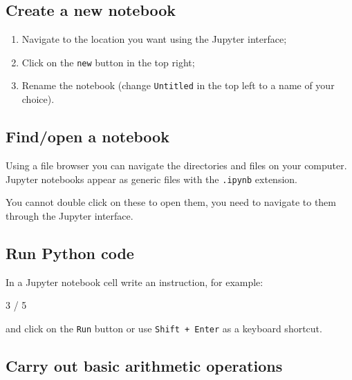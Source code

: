 \subsection{Create a new notebook}
\begin{enumerate}

\item 

Navigate to the location you want using the Jupyter interface;

\item 

Click on the \texttt{new} button in the top right;

\item 

Rename the notebook (change \texttt{Untitled} in the top left to a name of your choice).

\end{enumerate}


\subsection{Find/open a notebook}

Using a file browser you can navigate the directories and files on your
computer. Jupyter notebooks appear as generic files with the \texttt{.ipynb}
extension.


You cannot double click on these to open them, you need to navigate to them through the Jupyter interface.


\subsection{Run Python code}

In a Jupyter notebook cell write an instruction, for example:

\begin{pyin}
3 / 5
\end{pyin}


and click on the \texttt{Run} button or use \texttt{Shift + Enter} as a keyboard shortcut.


\subsection{Carry out basic arithmetic operations}
\label{sec:carry_out_basic_arithmetic_operations}

